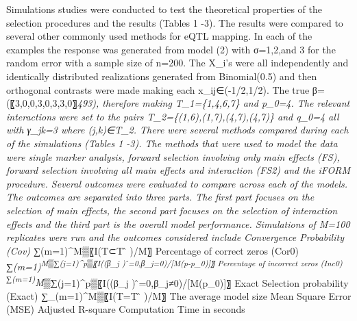 \documentclass[]{book}
\theoremstyle{definition}
\theoremstyle{definition}
\theoremstyle{remark}
\begin{document}
Simulations studies were conducted to test the theoretical properties of
the selection procedures and the results (Tables 1 -3). The results were
compared to several other commonly used methods for eQTL mapping. In
each of the examples the response was generated from model (2) with
σ=1,2,and 3 for the random error with a sample size of n=200. The X\_i's
were all independently and identically distributed realizations
generated from Binomial(0.5) and then orthogonal contrasts were made
making each x\_ij∈(-1/2,1/2). The true β=(〖3,0,0,3,0,3,3,0〗\emph{493),
therefore making T\_1=\{1,4,6,7\} and p\_0=4. The relevant interactions
were set to the pairs T\_2=\{(1,6),(1,7),(4,7),(4,7)\} and q\_0=4 all
with γ\_jk=3 where (j,k)∈T\_2. There were several methods compared
during each of the simulations (Tables 1 -3). The methods that were used
to model the data were single marker analysis, forward selection
involving only main effects (FS), forward selection involving all main
effects and interaction (FS2) and the iFORM procedure. Several outcomes
were evaluated to compare across each of the models. The outcomes are
separated into three parts. The first part focuses on the selection of
main effects, the second part focuses on the selection of interaction
effects and the third part is the overall model performance. Simulations
of M=100 replicates were run and the outcomes considered include
Convergence Probability (Cov) ∑}(m=1)\^{}M▒〖I(T⊂T ̂ )/M〗 Percentage of
correct zeros (Cor0)
∑\emph{(m=1)\textsuperscript{M▒∑\emph{(j=1)\^{}p▒〖I((β\_j )
̂=0,β\_j=0)/{[}M(p-p\_0){]}〗 Percentage of incorrect zeros (Inc0)
∑}(m=1)}M▒∑}(j=1)\^{}p▒〖I((β\_j ) ̂=0,β\_j≠0)/{[}M(p\_0){]}〗 Exact
Selection probability (Exact) ∑\_(m=1)\^{}M▒〖I(T=T ̂ )/M〗 The average
model size Mean Square Error (MSE) Adjusted R-square Computation Time in
seconds
\end{document}
